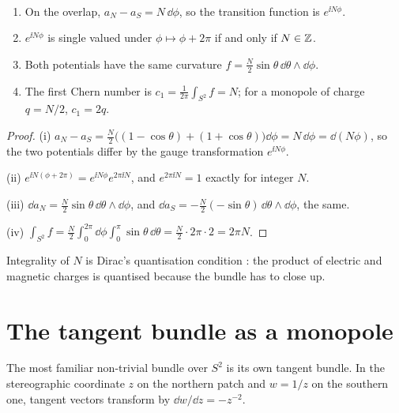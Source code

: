 \begin{theorem}\label{thm:dirac}\ver\
\begin{enumerate}[label=(\roman*)]
\item On the overlap, $a_N-a_S=N\,\dd\phi$, so the transition function is $e^{\ii N\phi}$.
\item $e^{\ii N\phi}$ is single valued under $\phi\mapsto\phi+2\pi$ if and only if $N\in\mathbb{Z}$.
\item Both potentials have the same curvature $f=\frac N2\sin\theta\,\dd\theta\wedge\dd\phi$.
\item The first Chern number is $c_1=\frac1{2\pi}\int_{S^2}f=N$; for a monopole of charge $q=N/2$, $c_1=2q$.
\end{enumerate}
\end{theorem}
\begin{proof}
(i) $a_N-a_S=\frac N2\bigl((1-\cos\theta)+(1+\cos\theta)\bigr)\dd\phi=N\,\dd\phi=\dd(N\phi)$, so the two potentials differ by the gauge transformation $e^{\ii N\phi}$.

(ii) $e^{\ii N(\phi+2\pi)}=e^{\ii N\phi}e^{2\pi\ii N}$, and $e^{2\pi\ii N}=1$ exactly for integer $N$.

(iii) $\dd a_N=\frac N2\sin\theta\,\dd\theta\wedge\dd\phi$, and $\dd a_S=-\frac N2(-\sin\theta)\,\dd\theta\wedge\dd\phi$, the same.

(iv) $\int_{S^2}f=\frac N2\int_0^{2\pi}\dd\phi\int_0^\pi\sin\theta\,\dd\theta=\frac N2\cdot2\pi\cdot2=2\pi N$.
\end{proof}


Integrality of $N$ is Dirac's quantisation condition \cite{Dirac1931}: the product of electric and magnetic charges is quantised because the bundle has to close up.

\section{The tangent bundle as a monopole}

The most familiar non-trivial bundle over $S^2$ is its own tangent bundle. In the stereographic coordinate $z$ on the northern patch and $w=1/z$ on the southern one, tangent vectors transform by $\dd w/\dd z=-z^{-2}$.

